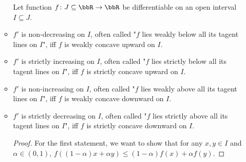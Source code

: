 \documentclass[a4paper,12pt]{report}
\begin{document}
\begin{itemize}
\begin{itemize}
Let function $f\colon J\subseteq\bbR\to\bbR$ be differentiable on an open interval $I\subseteq J$.
\bit
\item $f'$ is non-decreasing on $I$, often called "$f$ lies weakly below all its tagent lines on $I$", iff $f$ is weakly concave upward on $I$.
\item $f'$ is strictly increasing on $I$, often called "$f$ lies strictly below all its tagent lines on $I$", iff $f$ is strictly concave upward on $I$.
\item $f'$ is non-increasing on $I$, often called "$f$ lies weakly above all its tagent lines on $I$", iff $f$ is weakly concave downward on $I$.
\item $f'$ is strictly decreasing on $I$, often called "$f$ lies strictly above all its tagent lines on $I$", iff $f$ is strictly concave downward on $I$.
\eit
\begin{proof}
    For the first statement, we want to show that for any $x,y\in I$ and $\alpha\in(0,1)$, $f((1-\alpha)x+\alpha y)\leq(1-\alpha)f(x)+\alpha f(y)$.


\end{proof}
\end{itemize}
\end{itemize}
\end{document}
